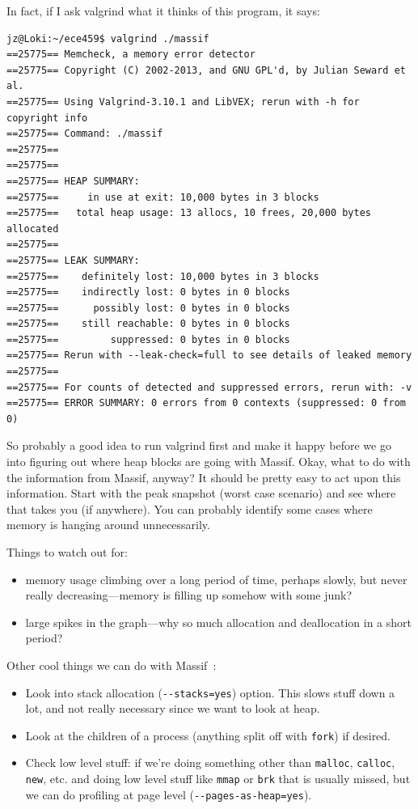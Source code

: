 \documentclass[a4paper]{report}
\begin{document}
In fact, if I ask valgrind what it thinks of this program, it says:

{\scriptsize
\begin{verbatim}
jz@Loki:~/ece459$ valgrind ./massif
==25775== Memcheck, a memory error detector
==25775== Copyright (C) 2002-2013, and GNU GPL'd, by Julian Seward et al.
==25775== Using Valgrind-3.10.1 and LibVEX; rerun with -h for copyright info
==25775== Command: ./massif
==25775== 
==25775== 
==25775== HEAP SUMMARY:
==25775==     in use at exit: 10,000 bytes in 3 blocks
==25775==   total heap usage: 13 allocs, 10 frees, 20,000 bytes allocated
==25775== 
==25775== LEAK SUMMARY:
==25775==    definitely lost: 10,000 bytes in 3 blocks
==25775==    indirectly lost: 0 bytes in 0 blocks
==25775==      possibly lost: 0 bytes in 0 blocks
==25775==    still reachable: 0 bytes in 0 blocks
==25775==         suppressed: 0 bytes in 0 blocks
==25775== Rerun with --leak-check=full to see details of leaked memory
==25775== 
==25775== For counts of detected and suppressed errors, rerun with: -v
==25775== ERROR SUMMARY: 0 errors from 0 contexts (suppressed: 0 from 0)
\end{verbatim}
}

So probably a good idea to run valgrind first and make it happy before we go into figuring out where heap blocks are going with Massif. Okay, what to do with the information from Massif, anyway? It should be pretty easy to act upon this information. Start with the peak snapshot (worst case scenario) and see where that takes you (if anywhere). You can probably identify some cases where memory is hanging around unnecessarily. 

\newpage
Things to watch out for:
\begin{itemize}
\item memory usage climbing over a long period of time, perhaps slowly, but never really decreasing---memory is filling up somehow with some junk? 
\item large spikes in the graph---why so much allocation and deallocation in a short period?
\end{itemize}

Other cool things we can do with Massif~\cite{massif}:

\begin{itemize}
	\item Look into stack allocation (\verb+--stacks=yes+) option. This slows stuff down a lot, and not really necessary since we want to look at heap.
	\item Look at the children of a process (anything split off with \texttt{fork}) if desired.
	\item Check low level stuff: if we're doing something other than \texttt{malloc}, \texttt{calloc}, \texttt{new}, etc. and doing low level stuff like \texttt{mmap} or \texttt{brk} that is usually missed, but we can do profiling at page level (\verb+--pages-as-heap=yes+).
\end{itemize}
\end{document}
